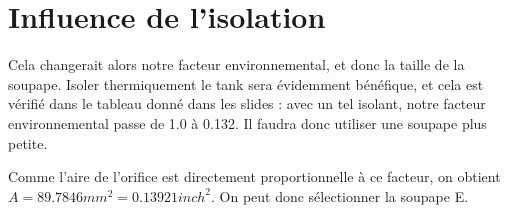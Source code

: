\section{Influence de l'isolation}
Cela changerait alors notre facteur environnemental, et donc la taille de la soupape. Isoler thermiquement le tank sera évidemment bénéfique, et cela est vérifié dans le tableau donné dans les slides : avec un tel isolant, notre facteur environnemental passe de 1.0 à 0.132. Il faudra donc utiliser une soupape plus petite. 

Comme l'aire de l'orifice est directement proportionnelle à ce facteur, on obtient $A=89.7846mm^2=0.13921inch^2$.
On peut donc sélectionner la soupape E.

